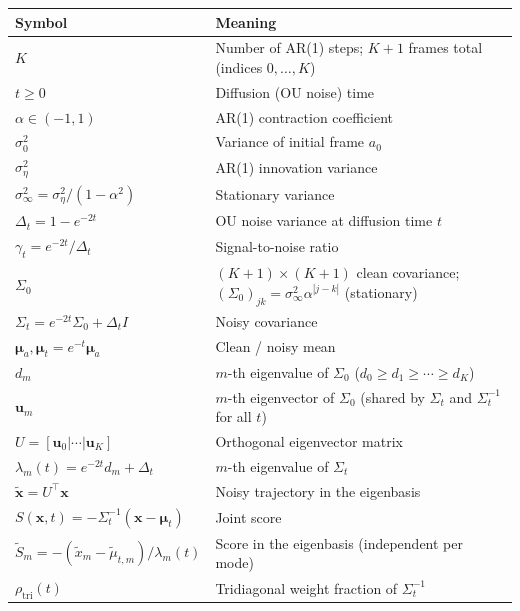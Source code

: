 \documentclass[11pt,a4paper]{article}
\newcommand{\Dt}{\Delta_t}
\newcommand{\sigeta}{\sigma_\eta^2}
\newcommand{\sigzero}{\sigma_0^2}
\newcommand{\siginf}{\sigma_\infty^2}
\begin{document}
\begin{center}
\small
\begin{tabular}{@{}ll@{}}
\toprule
\textbf{Symbol} & \textbf{Meaning} \\
\midrule
$K$ & Number of AR(1) steps; $K+1$ frames total (indices $0, \dots, K$) \\
$t \geq 0$ & Diffusion (OU noise) time \\
$\alpha \in (-1, 1)$ & AR(1) contraction coefficient \\
$\sigzero$ & Variance of initial frame $a_0$ \\
$\sigeta$ & AR(1) innovation variance \\
$\siginf = \sigeta/(1-\alpha^2)$ & Stationary variance \\
$\Dt = 1 - e^{-2t}$ & OU noise variance at diffusion time $t$ \\
$\gamma_t = e^{-2t}/\Dt$ & Signal-to-noise ratio \\
$\Sigma_0$ & $(K\!+\!1) \times (K\!+\!1)$ clean covariance; $(\Sigma_0)_{jk} = \siginf\alpha^{|j-k|}$ (stationary) \\
$\Sigma_t = e^{-2t}\Sigma_0 + \Dt I$ & Noisy covariance \\
$\bm{\mu}_a, \bm{\mu}_t = e^{-t}\bm{\mu}_a$ & Clean / noisy mean \\
$d_m$ & $m$-th eigenvalue of $\Sigma_0$ ($d_0 \geq d_1 \geq \cdots \geq d_K$) \\
$\mathbf{u}_m$ & $m$-th eigenvector of $\Sigma_0$ (shared by $\Sigma_t$ and $\Sigma_t^{-1}$ for all $t$) \\
$U = [\mathbf{u}_0 | \cdots | \mathbf{u}_K]$ & Orthogonal eigenvector matrix \\
$\lambda_m(t) = e^{-2t}d_m + \Dt$ & $m$-th eigenvalue of $\Sigma_t$ \\
$\tilde{\mathbf{x}} = U^\top\mathbf{x}$ & Noisy trajectory in the eigenbasis \\
$S(\mathbf{x}, t) = -\Sigma_t^{-1}(\mathbf{x} - \bm{\mu}_t)$ & Joint score \\
$\tilde{S}_m = -(\tilde{x}_m - \tilde{\mu}_{t,m})/\lambda_m(t)$ & Score in the eigenbasis (independent per mode) \\
$\rho_{\mathrm{tri}}(t)$ & Tridiagonal weight fraction of $\Sigma_t^{-1}$ \\
\bottomrule
\end{tabular}
\end{center}
\end{document}
